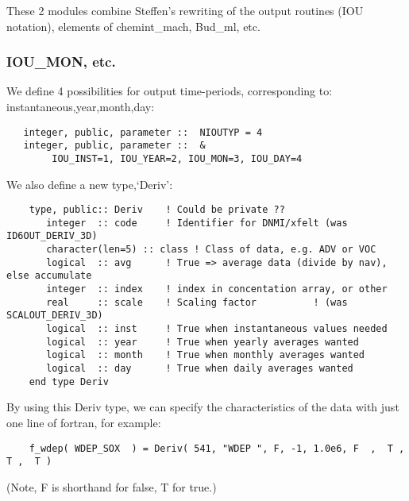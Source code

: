   
 These 2 modules combine Steffen's rewriting of the output routines
 (IOU notation), elements of chemint\_mach, Bud\_ml, etc.

  \subsubsection*{IOU\_MON, etc.}

  We define 4 possibilities
  for output time-periods, corresponding to: instantaneous,year,month,day:

  \begin{small}\begin{verbatim}
   integer, public, parameter ::  NIOUTYP = 4
   integer, public, parameter ::  & 
        IOU_INST=1, IOU_YEAR=2, IOU_MON=3, IOU_DAY=4
  \end{verbatim}
  \end{small}


   We also define a new type,`Deriv':

  \begin{small}\begin{verbatim}
    type, public:: Deriv    ! Could be private ??
       integer  :: code     ! Identifier for DNMI/xfelt (was ID6OUT_DERIV_3D)
       character(len=5) :: class ! Class of data, e.g. ADV or VOC
       logical  :: avg      ! True => average data (divide by nav), else accumulate
       integer  :: index    ! index in concentation array, or other
       real     :: scale    ! Scaling factor          ! (was SCALOUT_DERIV_3D)
       logical  :: inst     ! True when instantaneous values needed
       logical  :: year     ! True when yearly averages wanted
       logical  :: month    ! True when monthly averages wanted
       logical  :: day      ! True when daily averages wanted
    end type Deriv
  \end{verbatim}
  \end{small}


  By using this Deriv type, we can specify the characteristics of the data
  with just one line of fortran, for example:


  \begin{small}\begin{verbatim}
    f_wdep( WDEP_SOX  ) = Deriv( 541, "WDEP ", F, -1, 1.0e6, F  ,  T , T ,  T )
  \end{verbatim}
  \end{small}

  (Note, F is shorthand for false, T for true.)\\
  \bigskip



